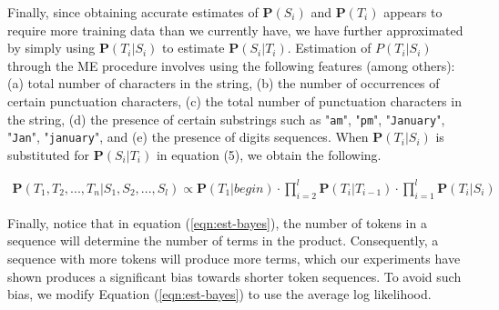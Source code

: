 Finally, since obtaining accurate estimates of 
$\mathbf{P}(S_i)$ and $\mathbf{P}(T_i)$ appears to require more training
data than we currently have, we have further approximated by simply
using
$\mathbf{P}(T_i|S_i)$ to estimate $\mathbf{P}(S_i|T_i)$.
Estimation of $P(T_i|S_i)$ through the ME procedure involves using
the following features (among others):
(a) total number of characters in the string,
(b) the number of occurrences of certain punctuation characters,
(c) the total number of punctuation characters in the string,
(d) the presence of certain substrings such as "{\tt am}", "{\tt pm}", 
"{\tt January}", "{\tt Jan}", "{\tt january}", and
(e) the presence of digits sequences.
When $\mathbf{P}(T_i|S_i)$ is substituted for
 $\mathbf{P}(S_i|T_i)$ in equation (5), we obtain the following.

\begin{eqnarray}\label{eqn:est-bayes}
\mathbf{P}(T_1, T_2, ..., T_n|S_1, S_2, ..., S_l) \propto
\mathbf{P}(T_1|begin) \cdot \prod_{i=2}^{l}\mathbf{P}(T_i|T_{i-1})
\cdot \prod_{i=1}^{l}\mathbf{P}(T_i|S_i)
\end{eqnarray}

Finally, notice that in equation (\ref{eqn:est-bayes}), the number of tokens
in a sequence will determine the number of terms in the product. 
Consequently, a sequence with more tokens will produce
more terms, which our experiments have shown produces a significant 
bias towards shorter token sequences.  
To avoid such bias, we modify
Equation (\ref{eqn:est-bayes}) to use the average log likelihood.

